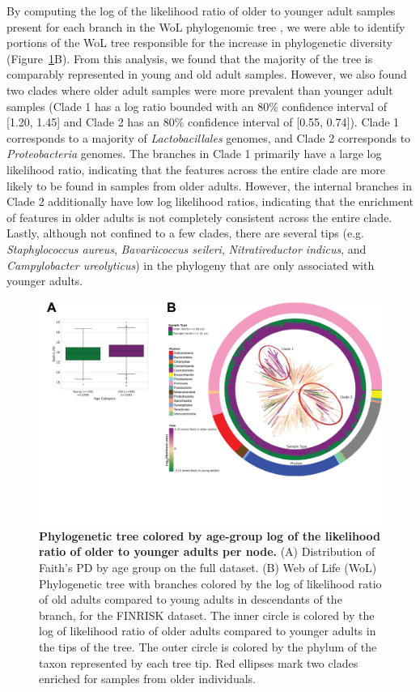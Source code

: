 By computing the log of the likelihood ratio of older to younger adult samples present for each branch in the WoL phylogenomic tree \cite{Zhu2019-od}, we were able to identify portions of the WoL tree responsible for the increase in phylogenetic diversity (Figure~\ref{faiths_pd_fig4}B). From this analysis, we found that the majority of the tree is comparably represented in young and old adult samples. However, we also found two clades where older adult samples were more prevalent than younger adult samples (Clade 1 has a log ratio bounded with an 80\% confidence interval of [1.20, 1.45] and Clade 2 has an 80\% confidence interval of [0.55, 0.74]). Clade 1 corresponds to a majority of \textit{Lactobacillales} genomes, and Clade 2 corresponds to \textit{Proteobacteria} genomes. The branches in Clade 1 primarily have a large log likelihood ratio, indicating that the features across the entire clade are more likely to be found in samples from older adults. However, the internal branches in Clade 2 additionally have low log likelihood ratios, indicating that the enrichment of features in older adults is not completely consistent across the entire clade. Lastly, although not confined to a few clades, there are several tips (e.g. \textit{Staphylococcus aureus}, \textit{Bavariicoccus seileri}, \textit{Nitratireductor indicus}, and \textit{Campylobacter ureolyticus}) in the phylogeny that are only associated with younger adults.

\begin{figure}[htbp]
\centering
\includegraphics[width=\textwidth]{faiths-pd-figures/figure04.png}
\caption[Phylogenetic tree colored by age-group log of the likelihood ratio of older to younger adults per node]{\textbf{Phylogenetic tree colored by age-group log of the likelihood ratio of older to younger adults per node.}  (A) Distribution of Faith's PD by age group on the full dataset. (B) Web of Life (WoL) Phylogenetic tree with branches colored by the log of likelihood ratio of old adults compared to young adults in descendants of the branch, for the FINRISK dataset. The inner circle is colored by the log of likelihood ratio of older adults compared to younger adults in the tips of the tree. The outer circle is colored by the phylum of the taxon represented by each tree tip. Red ellipses mark two clades enriched for samples from older individuals.}
\label{faiths_pd_fig4}
\end{figure}

